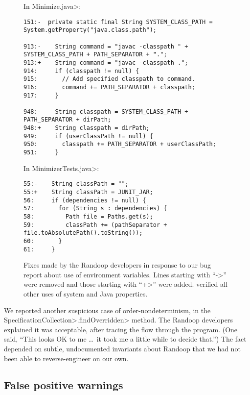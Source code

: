 \begin{figure}

\noindent
In \<Minimize.java>:

\begin{Verbatim}
151:-  private static final String SYSTEM_CLASS_PATH = System.getProperty("java.class.path");

913:-    String command = "javac -classpath " + SYSTEM_CLASS_PATH + PATH_SEPARATOR + ".";
913:+    String command = "javac -classpath .";
914:     if (classpath != null) {
915:       // Add specified classpath to command.
916:       command += PATH_SEPARATOR + classpath;
917:     }

948:-    String classpath = SYSTEM_CLASS_PATH + PATH_SEPARATOR + dirPath;
948:+    String classpath = dirPath;
949:     if (userClassPath != null) {
950:       classpath += PATH_SEPARATOR + userClassPath;
951:     }
\end{Verbatim}

\noindent
In \<MinimizerTests.java>:

\begin{Verbatim}
55:-    String classPath = "";
55:+    String classPath = JUNIT_JAR;
56:     if (dependencies != null) {
57:       for (String s : dependencies) {
58:         Path file = Paths.get(s);
59:         classPath += (pathSeparator + file.toAbsolutePath().toString());
60:       }
61:     }
\end{Verbatim}
\caption{Fixes made by the Randoop developers in response to our bug report
  about use of environment variables.  Lines starting with ``\<->'' were
  removed and those starting with ``\<+>'' were added.
  \TheDeterminismChecker verified all other uses of system and Java properties.}
\label{fig:randoop-bug-getenv}
\end{figure}


We reported another suspicious case of order-nondeterminism, in the
\<SpecificationCollection>\-\<.findOverridden> method.  The Randoop developers explained it was
acceptable, after tracing the flow through the program.  (One said, ``This
looks OK to me \ldots\ it took me a little while to decide that.'')  The fact
depended on subtle, undocumented invariants about Randoop that we had not
been able to reverse-engineer on our own.




\subsection{False positive warnings}

